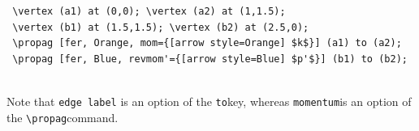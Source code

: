 \documentclass[10pt,letterpaper,twoside,notitlepage]{article}
\numberwithin{figure}{section}
\begin{document}
%
\begin{minipage}{0.83\linewidth}
\blucol\begin{verbatim}
 \vertex (a1) at (0,0); \vertex (a2) at (1,1.5);
 \vertex (b1) at (1.5,1.5); \vertex (b2) at (2.5,0);
 \propag [fer, Orange, mom={[arrow style=Orange] $k$}] (a1) to (a2);
 \propag [fer, Blue, revmom'={[arrow style=Blue] $p'$}] (b1) to (b2);
\end{verbatim}\txcol
\end{minipage}
%
\begin{minipage}{0.16\linewidth}
\end{minipage}
\\
Note that \blucol\verb!edge label!\txcol 
is an option of the \blucol\verb!to!\txcol key,
whereas \blucol\verb!momentum!\txcol is an option 
of the \blucol\verb!\propag!\txcol command.
%
\vspace{-3mm}
\end{document}
